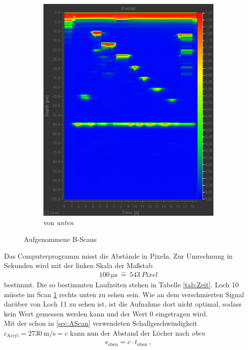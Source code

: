 \begin{figure}[h!]
\begin{subfigure}{.35\textwidth}
		\includegraphics[width=\textwidth]{unten.png}
		\caption{von \emph{unten}}
		\label{fig:unten}
	\end{subfigure}
	\caption{Aufgenommene B-Scans}
	\label{fig:BScan}
\end{figure}
Das Computerprogramm misst die Abstände in Pixeln. Zur Umrechnung in Sekunden wird mit der linken Skala der Maßstab
\begin{align}
	\SI{100}{\micro\second} \ \widehat{=} \ \SI{543}{Pixel}
\end{align}
bestimmt. Die so bestimmten Laufzeiten stehen in Tabelle \ref{tab:Zeit}. Loch 10 müsste im Scan \ref{fig:unten} rechts unten zu sehen sein. Wie an dem verschmierten Signal darüber von Loch 11 zu sehen ist, ist die Aufnahme dort nicht optimal, sodass kein Wert gemessen werden kann und der Wert 0 eingetragen wird.
 \\
Mit der schon in \ref{sec:AScan} verwendeten Schallgeschwindigkeit $c_\text{Acryl}=\SI{2730}{\meter\per\second}=c$ kann nun der Abstand der Löcher nach \emph{oben}
\begin{align}
	s_\text{oben} = c \cdot t_\text{oben} \ ,
\end{align}
